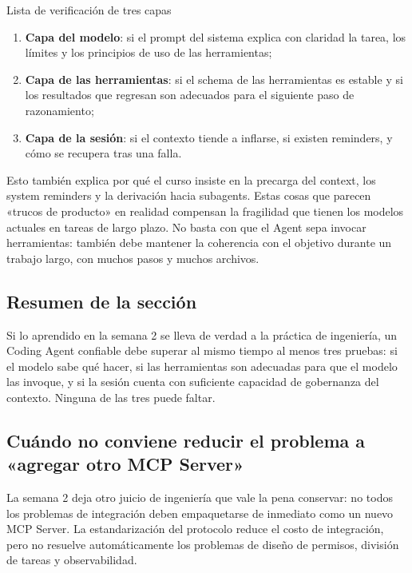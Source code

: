\documentclass[a4paper]{article}
\begin{document}
\begin{knowledgebox}{Lista de verificación de tres capas}
\begin{enumerate}
    \item \textbf{Capa del modelo}: si el prompt del sistema explica con claridad la tarea, los límites y los principios de uso de las herramientas;
    \item \textbf{Capa de las herramientas}: si el schema de las herramientas es estable y si los resultados que regresan son adecuados para el siguiente paso de razonamiento;
    \item \textbf{Capa de la sesión}: si el contexto tiende a inflarse, si existen reminders, y cómo se recupera tras una falla.
\end{enumerate}
\end{knowledgebox}

Esto también explica por qué el curso insiste en la precarga del context, los system reminders y la derivación hacia subagents. Estas cosas que parecen «trucos de producto» en realidad compensan la fragilidad que tienen los modelos actuales en tareas de largo plazo. No basta con que el Agent sepa invocar herramientas: también debe mantener la coherencia con el objetivo durante un trabajo largo, con muchos pasos y muchos archivos.

\subsection{Resumen de la sección}
Si lo aprendido en la semana 2 se lleva de verdad a la práctica de ingeniería, un Coding Agent confiable debe superar al mismo tiempo al menos tres pruebas: si el modelo sabe qué hacer, si las herramientas son adecuadas para que el modelo las invoque, y si la sesión cuenta con suficiente capacidad de gobernanza del contexto. Ninguna de las tres puede faltar.

\subsection{Cuándo no conviene reducir el problema a «agregar otro MCP Server»}
La semana 2 deja otro juicio de ingeniería que vale la pena conservar: no todos los problemas de integración deben empaquetarse de inmediato como un nuevo MCP Server. La estandarización del protocolo reduce el costo de integración, pero no resuelve automáticamente los problemas de diseño de permisos, división de tareas y observabilidad.
\end{document}
